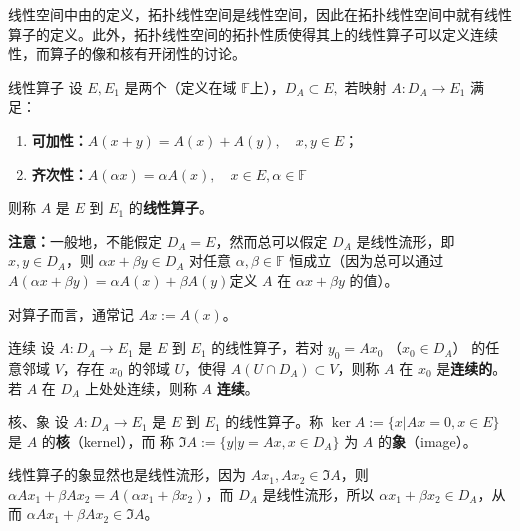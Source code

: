 
线性空间中由的定义，拓扑线性空间是线性空间，因此在拓扑线性空间中就有线性算子的定义。此外，拓扑线性空间的拓扑性质使得其上的线性算子可以定义连续性，而算子的像和核有开闭性的讨论。

\begin{definition}{线性算子}
设 $E,E_1$ 是两个（定义在域 $\mathbb F$上），$D_A\subset E,$ 若映射 $A:D_A\rightarrow E_1$ 满足：
\begin{enumerate}
\item \textbf{可加性：}$A(x+y)=A(x)+A(y),\quad x,y\in E$；
\item \textbf{齐次性：}$A(\alpha x)=\alpha A(x),\quad x\in E,\alpha\in \mathbb F$
\end{enumerate}
则称 $A$ 是 $E$ 到 $E_1$ 的\textbf{线性算子}。
  
\end{definition}

\textbf{注意：}一般地，不能假定 $D_A=E$，然而总可以假定 $D_A$ 是线性流形，即 $x,y\in D_A$，则 $\alpha x+\beta y\in D_A$ 对任意 $\alpha,\beta\in\mathbb F$ 恒成立（因为总可以通过 $A(\alpha x+\beta y)=\alpha A(x)+\beta A(y)$定义 $A$ 在 $\alpha x+\beta y$ 的值）。

对算子而言，通常记 $Ax:=A(x)$。

\begin{definition}{连续}
设 $A:D_A\rightarrow E_1$ 是 $E$ 到 $E_1$ 的线性算子，若对 $y_0=Ax_0$ （$x_0\in D_A$） 的任意邻域 $V$，存在 $x_0$ 的邻域 $U$，使得 $A(U\cap D_A)\subset V$，则称 $A$ 在 $x_0$ 是\textbf{连续的}。若 $A$ 在 $D_A$ 上处处连续，则称 $A$ \textbf{连续}。
\end{definition}


\begin{definition}{核、象}
设 $A:D_A\rightarrow E_1$ 是 $E$ 到 $E_1$ 的线性算子。称 $\ker A:=\{x|Ax=0,x\in E\}$ 是 $A$ 的\textbf{核}（kernel），而 称 $\Im A:=\{y|y=Ax,x\in D_A\}$ 为 $A$ 的\textbf{象}（image）。 
\end{definition}

线性算子的象显然也是线性流形，因为 $Ax_1,Ax_2\in \Im A$，则 $\alpha Ax_1+\beta Ax_2=A(\alpha x_1+\beta x_2)$，而 $D_A$ 是线性流形，所以 $\alpha x_1+\beta x_2\in D_A$，从而 $\alpha Ax_1+\beta Ax_2\in\Im A$。 






